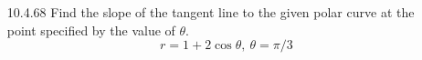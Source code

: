 \documentclass{article}
\begin{document}
\begin{enumerate}
\newpage

\item[10.4.68]
    Find the slope of the tangent line to the given polar
    curve at the point specified by the value of $\theta$.
    \[
        r = 1 + 2 \cos\theta,\ \theta = \pi/3
    \]

\end{enumerate}
\end{document}
